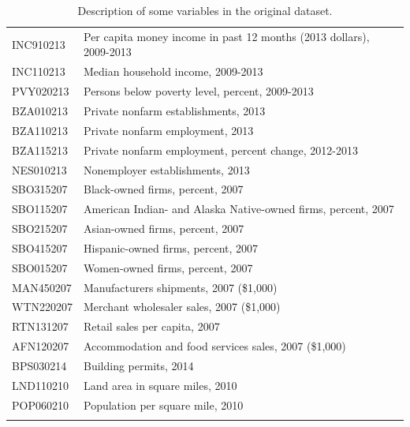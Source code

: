 \documentclass[12pt]{article}
\newcommand{\<}{\langle}
\renewcommand{\>}{\rangle}
\begin{document}
\begin{table}[!]
\begin{center}
\begin{tabular}{l|l}
INC910213 &  Per capita money income in past 12 months (2013 dollars), 2009-2013 \\ 
INC110213 &  Median household income, 2009-2013 \\ 
PVY020213 &  Persons below poverty level, percent, 2009-2013 \\ 
BZA010213 &  Private nonfarm establishments, 2013 \\ 
BZA110213 &  Private nonfarm employment,  2013 \\ 
BZA115213 &  Private nonfarm employment, percent change, 2012-2013 \\ 
NES010213 &  Nonemployer establishments, 2013 \\ 
SBO315207 &  Black-owned firms, percent, 2007 \\ 
SBO115207 &  American Indian- and Alaska Native-owned firms, percent, 2007 \\ 
SBO215207 &  Asian-owned firms, percent, 2007 \\ 
SBO415207 &  Hispanic-owned firms, percent, 2007 \\ 
SBO015207 &  Women-owned firms, percent, 2007 \\ 
MAN450207 &  Manufacturers shipments, 2007 (\$1,000) \\ 
WTN220207 &  Merchant wholesaler sales, 2007 (\$1,000) \\ 
RTN131207 &  Retail sales per capita, 2007 \\ 
AFN120207 &  Accommodation and food services sales, 2007 (\$1,000) \\ 
BPS030214 &  Building permits, 2014 \\ 
LND110210 &  Land area in square miles, 2010 \\ 
POP060210 &  Population per square mile, 2010 \\ 
\Xhline{1.25pt}
\end{tabular}
\end{center}
\caption{Description of some variables in the original dataset.}
\label{tab: variable info election data}
\end{table}


\end{document}
